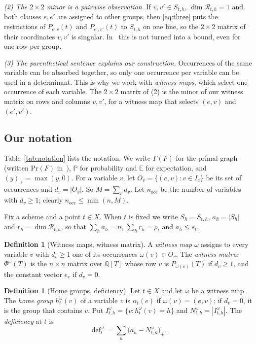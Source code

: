 \documentclass[11pt,a4paper]{article}
\theoremstyle{definition}
\newtheorem{definition}[theorem]{Definition}
\theoremstyle{remark}
\newcommand{\Q}{\mathbb{Q}}
\newcommand{\E}{\mathbb{E}}
\newcommand{\PP}{\mathbb{P}}
\newcommand{\cR}{\mathcal{R}}
\newcommand{\dfc}{\operatorname{def}}
\newcommand{\Gr}{\Gamma}
\newcommand{\nocc}{n_{\mathrm{occ}}}
\begin{document}
\emph{(2) The $2\times2$ minor is a pairwise observation.} If $v,v'\in S_{t,h}$,
$\dim\cR_{t,h}=1$ and both clauses $e,e'$ are assigned to other groups, then
\eqref{eq:three} puts the restrictions of $P_{e,v}(t)$ and $P_{e',v'}(t)$ to $S_{t,h}$ on
one line, so the $2\times2$ matrix of their coordinates $v,v'$ is singular. In~\cite{DL}
this is not turned into a bound, even for one row per group.

\emph{(3) The parenthetical sentence explains our construction.} Occurrences of the same
variable can be absorbed together, so only one occurrence per variable can be used in a
determinant. This is why we work with \emph{witness maps}, which select one occurrence of
each variable. The $2\times2$ matrix of (2) is the minor of our witness matrix on rows and
columns $v,v'$, for a witness map that selects $(e,v)$ and $(e',v')$.

\subsection{Our notation}\label{sec:ournot}

Table~\ref{tab:notation} lists the notation. We write $\Gr(F)$ for the primal graph (written
$\mathrm{Pr}(F)$ in~\cite{DL}), $\PP$ for probability and $\E$ for expectation, and
$(y)_+=\max(y,0)$. For a variable $v$, let $O_v=\{(e,v):v\in I_e\}$ be its set of occurrences
and $d_v=|O_v|$. So $M=\sum_vd_v$. Let $\nocc$ be the number of variables with $d_v\ge1$;
clearly $\nocc\le\min(n,M)$.

Fix a scheme and a point $t\in X$. When $t$ is fixed we write $S_h=S_{t,h}$, $a_h=|S_h|$ and
$r_h=\dim\cR_{t,h}$, so that $\sum_ha_h=n$, $\sum_hr_h=\rho_t$ and $a_h\le s_t$.

\begin{definition}[Witness maps, witness matrix]\label{def:witness}
A \emph{witness map} $\omega$ assigns to every variable $v$ with $d_v\ge1$ one of its
occurrences $\omega(v)\in O_v$. The \emph{witness matrix} $\Phi^\omega(T)$ is the $n\times n$
matrix over $\Q[T]$ whose row $v$ is $P_{\omega(v)}(T)$ if $d_v\ge1$, and the constant vector
$e_v$ if $d_v=0$.
\end{definition}

\begin{definition}[Home groups, deficiency]\label{def:def}
Let $t\in X$ and let $\omega$ be a witness map. The \emph{home group} $h^\omega_t(v)$ of a
variable $v$ is $\alpha_t(e)$ if $\omega(v)=(e,v)$; if $d_v=0$, it is the group that
contains $v$. Put $I^\omega_{t,h}=\{v:h^\omega_t(v)=h\}$ and $N^\omega_{t,h}=|I^\omega_{t,h}|$.
The \emph{deficiency} at $t$ is
\[
\dfc^\omega_t=\sum_h\bigl(a_h-N^\omega_{t,h}\bigr)_+ .
\]
\end{definition}
\end{document}
